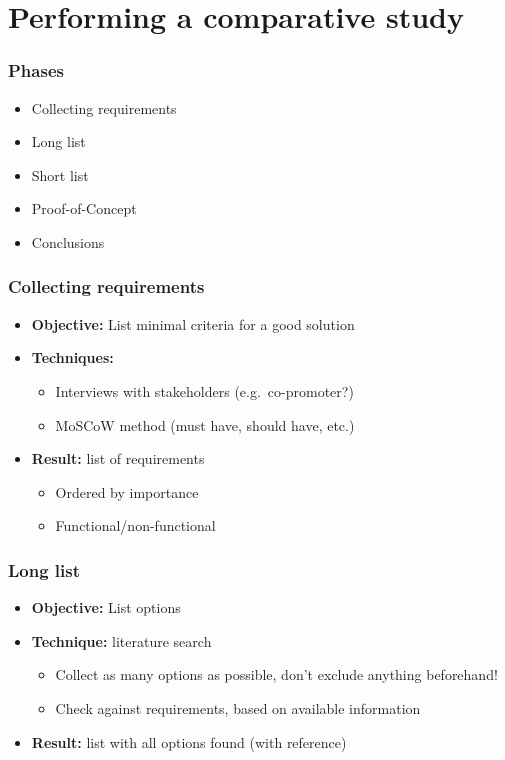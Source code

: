 \documentclass[aspectratio=169]{beamer}
\begin{document}
\section{Performing a comparative study}

\begin{frame}
  \frametitle{Phases}


  \begin{itemize}
    \item Collecting requirements
    \item Long list
    \item Short list
    \item Proof-of-Concept
    \item Conclusions
  \end{itemize}

\end{frame}

\begin{frame}
  \frametitle{Collecting requirements}

  \begin{itemize}
    \item \textbf{Objective:} List minimal criteria for a good solution
    \item \textbf{Techniques:}
          \begin{itemize}
            \item Interviews with stakeholders (e.g.\ co-promoter?)
            \item MoSCoW method (must have, should have, etc.)
          \end{itemize}
    \item \textbf{Result:} list of requirements
          \begin{itemize}
            \item Ordered by importance
            \item Functional/non-functional
          \end{itemize}
  \end{itemize}

\end{frame}

\begin{frame}
  \frametitle{Long list}

  \begin{itemize}
    \item \textbf{Objective:} List options
    \item \textbf{Technique:} literature search
          \begin{itemize}
            \item Collect as many options as possible, don't exclude anything beforehand!
            \item Check against requirements, based on available information
          \end{itemize}
    \item \textbf{Result:} list with all options found (with reference)
  \end{itemize}

\end{frame}
\end{document}
